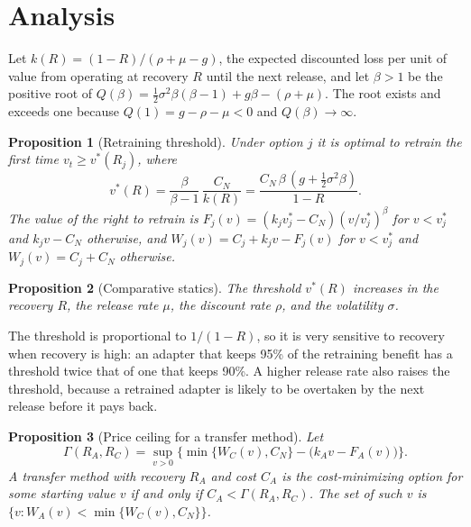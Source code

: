\documentclass[preprint,12pt,authoryear]{elsarticle}
\newtheorem{proposition}{Proposition}
\begin{document}
\section{Analysis}\label{sec:analysis}

Let $k(R)=(1-R)/(\rho+\mu-g)$, the expected discounted loss per unit of value from operating at recovery $R$ until the next release, and let $\beta>1$ be the positive root of $Q(\beta)=\tfrac12\sigma^2\beta(\beta-1)+g\beta-(\rho+\mu)$. The root exists and exceeds one because $Q(1)=g-\rho-\mu<0$ and $Q(\beta)\to\infty$.

\begin{proposition}[Retraining threshold]\label{prop:thr}
Under option $j$ it is optimal to retrain the first time $v_t\ge v^*(R_j)$, where
\begin{equation}\label{eq:vstar}
v^*(R)=\frac{\beta}{\beta-1}\,\frac{C_N}{k(R)}=\frac{C_N\,\beta\,(g+\tfrac12\sigma^2\beta)}{1-R}.
\end{equation}
The value of the right to retrain is $F_j(v)=(k_jv^*_j-C_N)(v/v^*_j)^\beta$ for $v<v^*_j$ and $k_jv-C_N$ otherwise, and $W_j(v)=C_j+k_jv-F_j(v)$ for $v<v^*_j$ and $W_j(v)=C_j+C_N$ otherwise.
\end{proposition}

\begin{proposition}[Comparative statics]\label{prop:cs}
The threshold $v^*(R)$ increases in the recovery $R$, the release rate $\mu$, the discount rate $\rho$, and the volatility $\sigma$.
\end{proposition}

The threshold is proportional to $1/(1-R)$, so it is very sensitive to recovery when recovery is high: an adapter that keeps 95\% of the retraining benefit has a threshold twice that of one that keeps 90\%. A higher release rate also raises the threshold, because a retrained adapter is likely to be overtaken by the next release before it pays back.

\begin{proposition}[Price ceiling for a transfer method]\label{prop:act}
Let
\begin{equation}\label{eq:gamma}
\Gamma(R_A,R_C)=\sup_{v>0}\Big\{\min\{W_C(v),C_N\}-\big(k_Av-F_A(v)\big)\Big\}.
\end{equation}
A transfer method with recovery $R_A$ and cost $C_A$ is the cost-minimizing option for some starting value $v$ if and only if $C_A<\Gamma(R_A,R_C)$. The set of such $v$ is $\{v: W_A(v)<\min\{W_C(v),C_N\}\}$.
\end{proposition}
\end{document}
